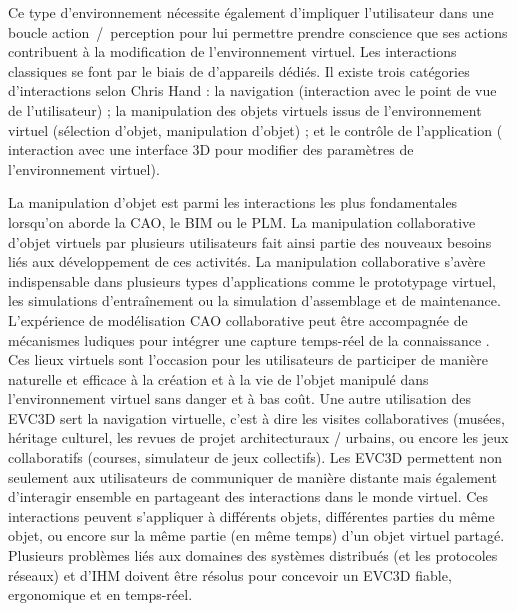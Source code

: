 Ce type d'environnement nécessite également d'impliquer l'utilisateur dans une 
boucle \og ac\-tion~/~per\-ception\fg{} pour lui permettre prendre conscience
que ses actions contribuent à la modification de l'environnement virtuel. Les 
interactions classiques se font par le biais de d'appareils dédiés.
Il existe trois catégories d'interactions selon Chris Hand \cite{Hand1997}: la 
navigation (interaction avec le point de vue de l'utilisateur) ; la manipulation des 
objets virtuels issus de l'environnement virtuel (sélection d'objet, manipulation 
d'objet) ; et le contrôle de l'application ( interaction avec une interface 3D pour 
modifier des paramètres de l'environnement virtuel).

La manipulation d'objet est parmi les interactions les plus fondamentales lorsqu'on 
aborde la \gls{CAO}, le \gls{BIM} ou le \gls{PLM}. La manipulation 
collaborative d'objet virtuels par plusieurs utilisateurs fait ainsi partie des nouveaux 
besoins liés aux développement de ces activités.
La manipulation collaborative s'avère indispensable dans plusieurs types 
d'applications comme le prototypage virtuel, les simulations d'entraînement ou la 
simulation d'assemblage et de maintenance. L'expérience de modélisation 
\gls{CAO} collaborative peut être accompagnée de mécanismes ludiques pour 
intégrer une capture temps-réel de la connaissance \cite{Kosmadoudi2013}.
Ces lieux virtuels sont l'occasion pour les utilisateurs de participer de manière 
naturelle et efficace à la création et à la vie de l'objet manipulé dans 
l'environnement virtuel sans danger et à bas coût. 
Une autre utilisation des \gls{EVC3D} sert la navigation virtuelle, c'est à dire les 
visites collaboratives (musées, héritage culturel, les revues de projet 
architecturaux / urbains, ou encore les jeux collaboratifs (courses, simulateur de 
jeux collectifs). 
Les \gls{EVC3D} permettent non seulement aux utilisateurs de communiquer de 
manière distante mais également d'interagir ensemble en partageant des 
interactions dans le monde virtuel. 
Ces interactions peuvent s'appliquer à différents objets, différentes parties du 
même objet, ou encore sur la même partie (en même temps) d'un objet virtuel 
partagé.
Plusieurs problèmes liés aux domaines des systèmes distribués (et les protocoles 
réseaux) et d'IHM doivent être résolus pour concevoir un 
\gls{EVC3D} fiable, ergonomique et en temps-réel. 




